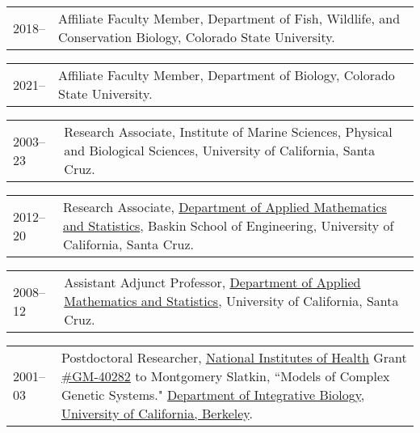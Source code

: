 \documentclass[11pt]{article}
\newlength{\myindent}
\newlength{\scndcol}
\begin{document}
\begin{tabular}{ @{}p{2.5\myindent} p{\scndcol}@{}  }
\hspace*{\myindent}2018-- & Affiliate Faculty Member, Department of Fish, Wildlife, and Conservation Biology, Colorado State University.
\\
\end{tabular}

\begin{tabular}{ @{}p{2.5\myindent} p{\scndcol}@{}  }
\hspace*{\myindent}2021-- & Affiliate Faculty Member, Department of Biology, Colorado State University.
\\
\end{tabular}



\begin{tabular}{ @{}p{2.5\myindent} p{\scndcol}@{}  }
\hspace*{\myindent}2003--23 & Research Associate, Institute of Marine Sciences, Physical and Biological Sciences, University of California, Santa Cruz.
\\
\end{tabular}

\begin{tabular}{ @{}p{2.5\myindent} p{\scndcol}@{}  }
\hspace*{\myindent}2012--20 & Research Associate, \href{http://www.ams.ucsc.edu/}{Department of Applied Mathematics and Statistics}, Baskin School of Engineering, University of California, Santa Cruz.
\\
\end{tabular}

\begin{tabular}{ @{}p{2.5\myindent} p{\scndcol}@{}  }
\hspace*{\myindent}2008--12 & Assistant Adjunct  Professor, \href{http://www.ams.ucsc.edu/}{Department of Applied Mathematics and Statistics}, University of California, Santa Cruz.
\\
\end{tabular}


\begin{tabular}{ @{}p{2.5\myindent} p{\scndcol}@{}  }
\hspace*{\myindent}2001--03 &  Postdoctoral Researcher, \href{http://www.nih.gov/}{National Institutes of Health} Grant
\href{http://crisp.cit.nih.gov/crisp/CRISP_LIB.getdoc?textkey=6646473\&p_grant_num=5R01GM040282-16\&p_query=\&ticket=8287715\&p_audit_session_id=37483287\&p_keywords=}{\#GM-40282} to Montgomery Slatkin, ``Models of Complex Genetic Systems." \href{http://ib.berkeley.edu/}{Department of 
Integrative Biology}, \href{http://www.berkeley.edu/}{University of California, Berkeley}. 
\end{tabular}
\end{document}
